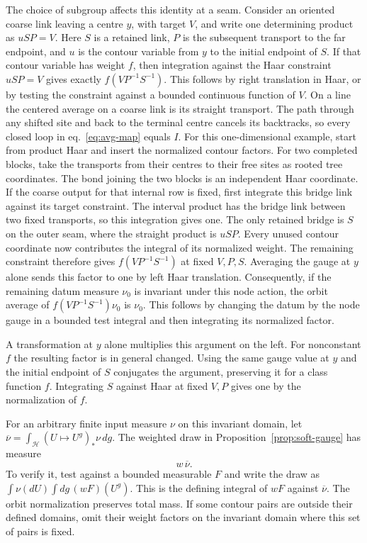 \documentclass[11pt,letterpaper,reqno]{amsart}
\numberwithin{equation}{section}
\renewcommand{\eqref}[1]{\textup{eq.~\ref{#1}}}
\theoremstyle{definition}
\theoremstyle{remark}
\begin{document}
The choice of subgroup affects this identity at a seam. Consider an
oriented coarse link leaving a centre \(y\), with target \(V\), and
write one determining product as \(uSP=V\). Here \(S\) is a retained
link, \(P\) is the subsequent transport to the far endpoint, and
\(u\) is the contour variable from \(y\) to the initial endpoint of
\(S\). If that contour variable has weight \(f\), then integration
against the Haar constraint \(uSP=V\) gives exactly
\(f(VP^{-1}S^{-1})\). This follows by right translation in Haar,
or by testing the constraint against a bounded continuous function
of \(V\). 
On a line the centered average on a coarse link is its straight
transport. The path through any shifted site and back to the
terminal centre cancels its backtracks, so every closed loop
in \eqref{eq:avg-map} equals \(I\). For this one-dimensional example,
start from product Haar and insert the normalized contour factors.
For two completed blocks,
take the transports from their centres to their free sites
as rooted tree coordinates. The bond joining the two blocks
is an independent Haar coordinate. If the coarse output for
that internal row is fixed, first integrate this bridge link
against its target constraint. The interval product has
the bridge link between two fixed transports, so this integration
gives one. The only retained bridge is \(S\) on the outer seam,
where the straight product is \(uSP\). Every unused contour
coordinate now contributes the integral of its normalized
weight. The remaining constraint therefore gives
\(f(VP^{-1}S^{-1})\) at fixed \(V,P,S\).
Averaging the gauge at \(y\) alone sends this factor to one by
left Haar translation. Consequently, if the remaining datum measure
\(\nu_0\) is invariant under this node action, the orbit average
of \(f(VP^{-1}S^{-1})\nu_0\) is \(\nu_0\). This follows by
changing the datum by the node gauge in a bounded test integral
and then integrating its normalized factor.

A transformation at \(y\) alone multiplies this argument
on the left. For nonconstant \(f\) the resulting factor is in general
changed. Using the same gauge value at \(y\) and the initial
endpoint of \(S\) conjugates the argument, preserving it for a class
function \(f\). Integrating \(S\) against Haar at fixed \(V,P\)
gives one by the normalization of \(f\).

For an arbitrary finite input measure $\nu$ on this invariant domain, let
$\overline\nu=\int_{\mathcal H}(U\mapsto U^g)_*\nu\,dg$.
The weighted draw in Proposition~\ref{prop:soft-gauge} has measure
\begin{equation}\label{eq:soft-arbitrary-input}
                         w\,\overline\nu .
\end{equation}
To verify it, test against a bounded measurable $F$ and write the
draw as $\int\nu(dU)\int dg\,(wF)(U^g)$. This is the defining
integral of $wF$ against $\overline\nu$. The orbit normalization
preserves total mass. If some contour pairs are outside their
defined domains, omit their weight factors on the invariant
domain where this set of pairs is fixed.
\end{document}
